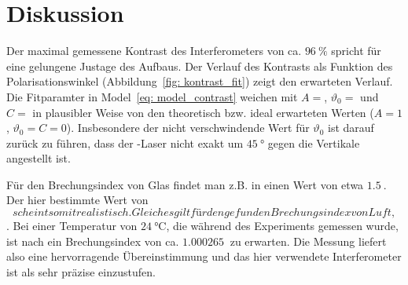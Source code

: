 \newpage
\section{Diskussion}
Der maximal gemessene Kontrast des Interferometers von ca. $\SI{96}{\percent}$ spricht für 
eine gelungene Justage des Aufbaus. Der Verlauf des Kontrasts als Funktion des Polarisationswinkel 
(Abbildung~\ref{fig: kontrast_fit}) zeigt den erwarteten Verlauf. Die Fitparamter in Model~\eqref{eq: model_contrast} weichen mit 
$A = $, $\vartheta_0 = $ 
und $C = $ in plausibler Weise von den theoretisch bzw. ideal erwarteten Werten 
($A = 1$, $\vartheta_0 = C = 0$). Insbesondere 
der nicht verschwindende Wert für $\vartheta_0$ ist darauf zurück zu führen, dass der -Laser 
nicht exakt um $\SI{45}{\degree}$ gegen die Vertikale angestellt ist.

Für den Brechungsindex von Glas findet man z.B. in \cite{rii} einen Wert von etwa $\SI{1.5}{}$. Der hier bestimmte 
Wert von $$ scheint somit realistisch. Gleiches gilt 
für den gefunden Brechungsindex von Luft, $$. Bei einer Temperatur von $\SI{24}{\celsius}$, die 
während des Experiments gemessen wurde, ist nach \cite{refr_index_air} ein Brechungsindex von ca. $\SI{1.000265}{}$ zu erwarten. 
Die Messung liefert also eine hervorragende Übereinstimmung und das hier verwendete Interferometer ist als 
sehr präzise einzustufen.
